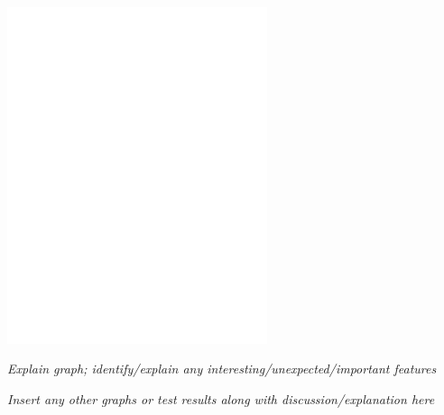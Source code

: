 \documentclass[11pt, letterpaper]{article}
\begin{document}
\centerline{\includegraphics[width=3in]{plot3b}}

{\em Explain graph; identify/explain any
  interesting/unexpected/important features}

{\em Insert any other graphs or test results along with
  discussion/explanation here}
\end{document}
